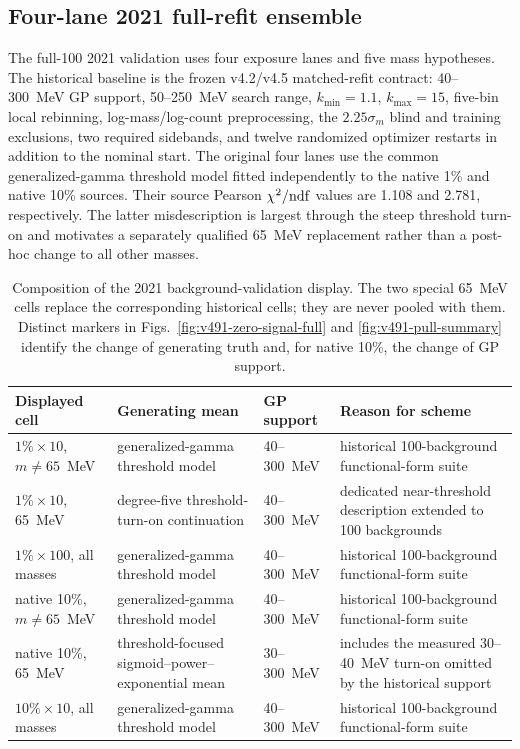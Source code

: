 \subsection{Four-lane 2021 full-refit ensemble}
\label{sec:v491-four-lane-ensemble}

The full-100 2021 validation uses four exposure lanes and five mass hypotheses.  The
historical baseline is the frozen v4.2/v4.5 matched-refit contract: 40--300~MeV GP
support, 50--250~MeV search range, $k_{\min}=1.1$, $k_{\max}=15$,
five-bin local rebinning, log-mass/log-count preprocessing, the
$2.25\sigma_m$ blind and training exclusions, two required sidebands, and twelve
randomized optimizer restarts in addition to the nominal start.  The original four
lanes use the common generalized-gamma threshold model fitted independently to the
native 1\% and native 10\% sources.  Their source Pearson
$\chi^2/{\rm ndf}$ values are 1.108 and 2.781, respectively.  The latter
misdescription is largest through the steep threshold
turn-on and motivates a separately qualified 65~MeV replacement rather than a
post-hoc change to all other masses.

\begin{table}[htbp]
\centering
\small
\begin{tabularx}{\textwidth}{P{0.17\textwidth}P{0.20\textwidth}P{0.24\textwidth}Y}
\toprule
Displayed cell & Generating mean & GP support & Reason for scheme \\
\midrule
$1\%\times10$, $m\neq65$~MeV & generalized-gamma threshold model & 40--300~MeV & historical 100-background functional-form suite \\
$1\%\times10$, 65~MeV & degree-five threshold-turn-on continuation & 40--300~MeV & dedicated near-threshold description extended to 100 backgrounds \\
$1\%\times100$, all masses & generalized-gamma threshold model & 40--300~MeV & historical 100-background functional-form suite \\
native 10\%, $m\neq65$~MeV & generalized-gamma threshold model & 40--300~MeV & historical 100-background functional-form suite \\
native 10\%, 65~MeV & threshold-focused sigmoid--power--exponential mean & 30--300~MeV & includes the measured 30--40~MeV turn-on omitted by the historical support \\
$10\%\times10$, all masses & generalized-gamma threshold model & 40--300~MeV & historical 100-background functional-form suite \\
\bottomrule
\end{tabularx}
\caption{Composition of the 2021 background-validation display.  The two
special 65~MeV cells replace the corresponding historical cells; they are never
pooled with them.  Distinct markers in Figs.~\ref{fig:v491-zero-signal-full} and
\ref{fig:v491-pull-summary} identify the change of generating truth and, for native
10\%, the change of GP support.}
\label{tab:v491-composite-scheme-map}
\end{table}


